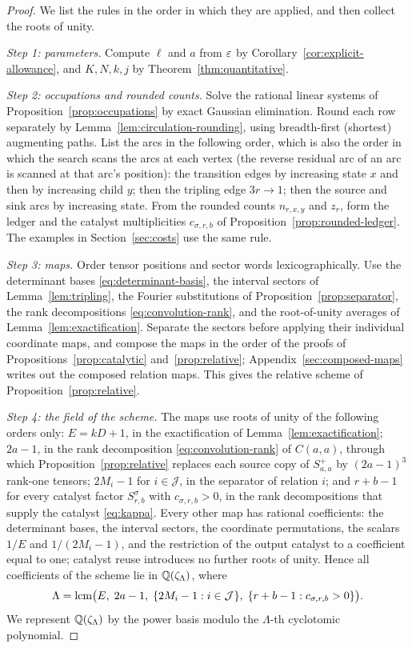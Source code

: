 \begin{proof}
We list the rules in the order in which they are applied, and then
collect the roots of unity.

\emph{Step 1: parameters.} Compute \(\ell\) and \(a\) from \(\varepsilon\) by
Corollary~\ref{cor:explicit-allowance}, and \(K,N,k,j\) by
Theorem~\ref{thm:quantitative}.

\emph{Step 2: occupations and rounded counts.} Solve the rational linear
systems of Proposition~\ref{prop:occupations} by exact Gaussian
elimination. Round each row separately by
Lemma~\ref{lem:circulation-rounding}, using breadth-first (shortest)
augmenting paths. List the arcs in the following order, which is also
the order in which the search scans the arcs at each vertex (the reverse
residual arc of an arc is scanned at that arc's position): the
transition edges by increasing state \(x\) and then by increasing child
\(y\); then the tripling edge \(3r\to1\); then the source and sink arcs
by increasing state. From the rounded counts \(n_{r,x,y}\) and \(z_r\),
form the ledger and the catalyst multiplicities \(c_{\sigma,r,b}\) of
Proposition~\ref{prop:rounded-ledger}. The examples in
Section~\ref{sec:costs} use the same rule.

\emph{Step 3: maps.} Order tensor positions and sector words
lexicographically. Use the determinant bases
\eqref{eq:determinant-basis}, the interval sectors of
Lemma~\ref{lem:tripling}, the Fourier substitutions of
Proposition~\ref{prop:separator}, the rank decompositions
\eqref{eq:convolution-rank}, and the root-of-unity averages of
Lemma~\ref{lem:exactification}. Separate the sectors before applying
their individual coordinate maps, and compose the maps in the order of
the proofs of Propositions~\ref{prop:catalytic}
and~\ref{prop:relative}; Appendix~\ref{sec:composed-maps} writes out
the composed relation maps. This gives the relative scheme of
Proposition~\ref{prop:relative}.

\emph{Step 4: the field of the scheme.} The maps use roots of unity of
the following orders only:
\(E=kD+1\), in the exactification of Lemma~\ref{lem:exactification};
\(2a-1\), in the rank decomposition \eqref{eq:convolution-rank} of
\(C(a,a)\), through which Proposition~\ref{prop:relative} replaces each
source copy of \(S^+_{a,a}\) by \((2a-1)^3\) rank-one tensors;
\(2M_i-1\) for \(i\in\mathcal J\), in the separator of relation \(i\);
and \(r+b-1\) for every catalyst factor \(S^\sigma_{r,b}\) with
\(c_{\sigma,r,b}>0\), in the rank decompositions that supply the
catalyst \eqref{eq:kappa}. Every other map has rational coefficients:
the determinant bases, the interval sectors, the coordinate
permutations, the scalars \(1/E\) and \(1/(2M_i-1)\), and the
restriction of the output catalyst to a coefficient equal to one;
catalyst reuse introduces no further roots of unity. Hence all
coefficients of the scheme lie in \(\mathbb Q(\zeta_\Lambda)\), where
\begin{equation}\label{eq:cyclotomic-order}
 \Lambda=\operatorname{lcm}\bigl(E,\;2a-1,\;\{2M_i-1:i\in\mathcal J\},\;
       \{r+b-1:c_{\sigma,r,b}>0\}\bigr).
\end{equation}
We represent \(\mathbb Q(\zeta_\Lambda)\) by the power basis modulo the
\(\Lambda\)-th cyclotomic polynomial.


\end{proof}
